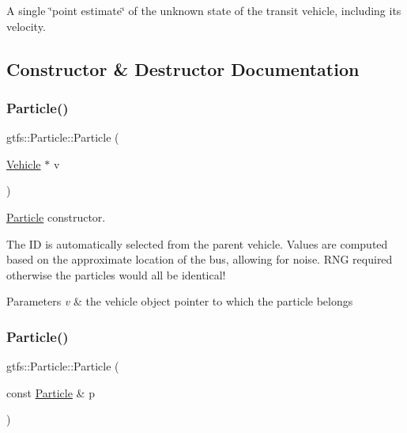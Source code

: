 A single \char`\"{}point estimate\char`\"{} of the unknown state of the transit vehicle, including its velocity. 

\subsection{Constructor \& Destructor Documentation}
\mbox{\label{classgtfs_1_1Particle_ad7f42e77c6c7f3042c977fd5a42ff82f}} 
\subsubsection{\texorpdfstring{Particle()}{Particle()}\hspace{0.1cm}{\footnotesize\ttfamily [1/2]}}
{\footnotesize\ttfamily gtfs\+::\+Particle\+::\+Particle (\begin{DoxyParamCaption}\item[{\hyperlink{classgtfs_1_1Vehicle}{Vehicle} $\ast$}]{v }\end{DoxyParamCaption})}

\hyperlink{classgtfs_1_1Particle}{Particle} constructor.

The ID is automatically selected from the parent vehicle. Values are computed based on the approximate location of the bus, allowing for noise. R\+NG required otherwise the particles would all be identical!


\begin{DoxyParams}{Parameters}
{\em v} & the vehicle object pointer to which the particle belongs \\
\hline
\end{DoxyParams}
\mbox{\label{classgtfs_1_1Particle_ac386e64b43b1e317063f9a6666d604ce}} 
\subsubsection{\texorpdfstring{Particle()}{Particle()}\hspace{0.1cm}{\footnotesize\ttfamily [2/2]}}
{\footnotesize\ttfamily gtfs\+::\+Particle\+::\+Particle (\begin{DoxyParamCaption}\item[{const \hyperlink{classgtfs_1_1Particle}{Particle} \&}]{p }\end{DoxyParamCaption})}

